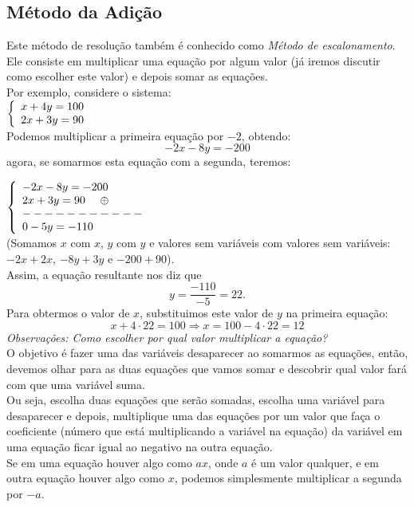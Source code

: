 \documentclass[a4paper,12pt]{article}
\begin{document}
     \subsection{Método da Adição}
     Este método de resolução também é conhecido como \emph{Método de escalonamento}. Ele consiste em multiplicar uma equação por algum valor (já iremos discutir como escolher este valor) e depois somar as equações. \\
     Por exemplo, considere o sistema: \\
   $ 
\left\{
\begin{array}{ll}
\displaystyle x + 4y = 100 \\
\displaystyle 2x + 3y = 90 \\

\end{array}
\right.\\
$
   \\
   
   Podemos multiplicar a primeira equação por $-2$, obtendo:
   $$-2x -8y = -200$$
   agora, se somarmos esta equação com a segunda, teremos:
   
   $ 
\left\{
\begin{array}{ll}
\displaystyle -2x -8y = -200 \\
\displaystyle 2x + 3y = 90 \ \ \  \  \oplus\\
\displaystyle ----------- \\
\displaystyle 0 -5y = -110 \\
\end{array}
\right.\\
$
   \\
   (Somamos $x$ com $x$, $y$ com $y$ e valores sem variáveis com valores sem variáveis: $-2x + 2x$, $-8y + 3y$ e $-200 + 90$).\\
   Assim, a equação resultante nos diz que
   $$y = \frac{-110}{-5} = 22.$$
   Para obtermos o valor de $x$, substituimos este valor de $y$ na primeira equação: \\
   $$x + 4\cdot22 = 100  \Rightarrow x = 100 - 4\cdot22 = 12$$
   \emph{Observações: Como escolher por qual valor multiplicar a equação?}\\
   O objetivo é fazer uma das variáveis desaparecer ao somarmos as equações, então, devemos olhar para as duas equações que vamos somar e descobrir qual valor fará com que uma variável suma. \\
   Ou seja, escolha duas equações que serão somadas, escolha uma variável para desaparecer e depois, multiplique uma das equações por um valor que faça o coeficiente (número que está multiplicando a variável na equação) da variável em uma equação ficar igual ao negativo na outra equação. \\
   Se em uma equação houver algo como $ax$, onde $a$ é um valor qualquer, e em outra equação houver algo como $x$, podemos simplesmente multiplicar a segunda por $-a$. \\
  
\end{document}
